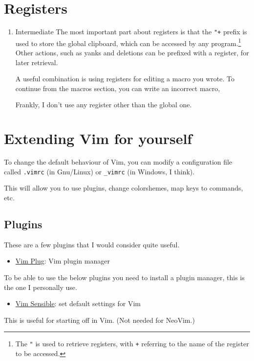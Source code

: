 \documentclass[11pt]{article}
\begin{document}
\section{Registers}
\label{sec:orgafc02a3}
\begin{enumerate}
\item Intermediate
\label{sec:orge9b1fd4}
The most important part about registers is that the \texttt{"+} prefix
is used to store the global clipboard, which can be accessed by any
program.\footnote{The \texttt{"} is used to retrieve registers, with \texttt{+} referring to the name
of the register to be accessed.} Other actions, such as yanks and deletions can be prefixed with a
register, for later retrieval.

A useful combination is using registers for editing a macro you wrote.
To continue from the macros section, you can write an incorrect macro, 

Frankly, I don't use any register other than the global one.
\end{enumerate}
\section{Extending Vim for yourself}
\label{sec:org6f8e722}
To change the default behaviour of Vim, you can modify a configuration file
called \texttt{.vimrc} (in Gnu/Linux) or \texttt{\_vimrc} (in Windows, I think).

This will allow you to use plugins, change colorshemes, map keys to commands,
etc.
\subsection{Plugins}
\label{sec:orgecbb07c}
These are a few plugins that I would consider quite useful.

\begin{itemize}
\item \href{https://github.com/junegunn/vim-plug}{Vim Plug}: Vim plugin manager
\end{itemize}
To be able to use the below plugins you need to install a plugin manager, this
is the one I personally use.

\begin{itemize}
\item \href{https://github.com/tpope/vim-sensible}{Vim Sensible}: set default settings for Vim
\end{itemize}
This is useful for starting off in Vim. (Not needed for NeoVim.)
\end{document}
